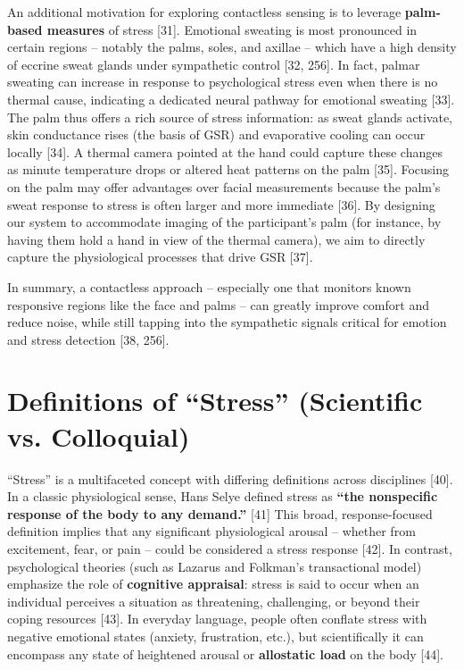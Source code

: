 \documentclass{article}
\begin{document}
    An additional motivation for exploring contactless sensing is to leverage \textbf{palm-based measures} of stress [31]. Emotional sweating is most pronounced in certain regions – notably the palms, soles, and axillae – which have a high density of eccrine sweat glands under sympathetic control [32, 256]. In fact, palmar sweating can increase in response to psychological stress even when there is no thermal cause, indicating a dedicated neural pathway for emotional sweating [33]. The palm thus offers a rich source of stress information: as sweat glands activate, skin conductance rises (the basis of GSR) and evaporative cooling can occur locally [34]. A thermal camera pointed at the hand could capture these changes as minute temperature drops or altered heat patterns on the palm [35]. Focusing on the palm may offer advantages over facial measurements because the palm’s sweat response to stress is often larger and more immediate [36]. By designing our system to accommodate imaging of the participant’s palm (for instance, by having them hold a hand in view of the thermal camera), we aim to directly capture the physiological processes that drive GSR [37].

    In summary, a contactless approach – especially one that monitors known responsive regions like the face and palms – can greatly improve comfort and reduce noise, while still tapping into the sympathetic signals critical for emotion and stress detection [38, 256].

    \section{Definitions of “Stress” (Scientific vs. Colloquial)}
    “Stress” is a multifaceted concept with differing definitions across disciplines [40]. In a classic physiological sense, Hans Selye defined stress as \textbf{“the nonspecific response of the body to any demand.”} [41] This broad, response-focused definition implies that any significant physiological arousal – whether from excitement, fear, or pain – could be considered a stress response [42]. In contrast, psychological theories (such as Lazarus and Folkman’s transactional model) emphasize the role of \textbf{cognitive appraisal}: stress is said to occur when an individual perceives a situation as threatening, challenging, or beyond their coping resources [43]. In everyday language, people often conflate stress with negative emotional states (anxiety, frustration, etc.), but scientifically it can encompass any state of heightened arousal or \textbf{allostatic load} on the body [44].
\end{document}
